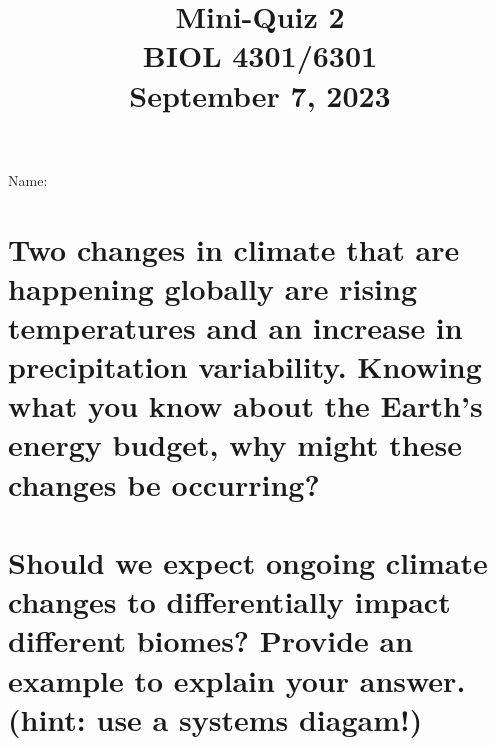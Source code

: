\documentclass[12pt, notitlepage]{article}   	%
\title{
	\textbf{
		Mini-Quiz 2
	} \\
	\large BIOL 4301/6301 \\
	\large September 7, 2023 \\
}
\date{\vspace{-5ex}}
\begin{document}
{\selectfont %

\large{Name:}

{\let\newpage\relax\maketitle}

\section{\small{Two changes in climate that are happening globally are rising temperatures
and an increase in precipitation variability. Knowing what you know about the Earth's
energy budget, why might these changes be occurring?}}

\newpage

\section{\small{Should we expect ongoing climate changes to differentially impact different biomes?
Provide an example to explain your answer. (hint: use a systems diagam!)}}

} %
\end{document}
